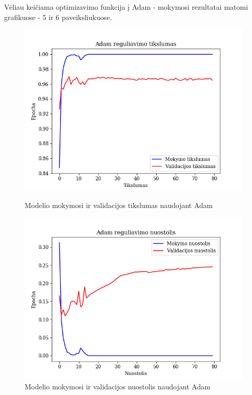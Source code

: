 \documentclass{VUMIFPSkursinis}
\begin{document}
Vėliau keičiama optimizavimo funkcija į Adam - mokymosi rezultatai matomi grafikuose - 5 ir 6 paveiksliukuose.

\begin{figure}[!htbp]
  \centering
  \begin{minipage}[b]{0.49\textwidth}
    \includegraphics[width=\textwidth]{img/FT/Adam_acc.png}
    \caption{Modelio mokymosi ir validacijos tikslumas naudojant Adam}
  \end{minipage}
  \begin{minipage}[b]{0.49\textwidth}
    \includegraphics[width=\textwidth]{img/FT/Adam_loss.png}
    \caption{Modelio mokymosi ir validacijos nuostolis naudojant Adam}
  \end{minipage}
\end{figure}
\end{document}

